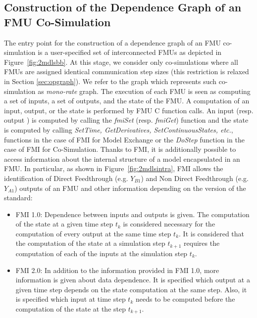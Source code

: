 \subsection{Construction of the Dependence Graph of an FMU Co-Simulation}

The entry point for the construction of a dependence graph of an FMU co-simulation is a user-specified set of interconnected FMUs as depicted in Figure~\ref{fig:2mdlsbb}. At this stage, we consider only co-simulations where all FMUs are assigned identical communication step sizes (this restriction is relaxed in Section \ref{sec:opgraph}). We refer to the graph which represents such co-simulation as \textit{mono-rate} graph. The execution of each FMU is seen as computing a set of inputs, a set of outputs, and the state of the FMU. A computation of an input, output, or the state is performed by FMU C function calls. An input (resp. output ) is computed by calling the \textit{fmiSet} (resp. \textit{fmiGet}) function and the state is computed by calling \textit{SetTime, GetDerivatives, SetContinuousStates, etc.}, functions in the case of FMI for Model Exchange or the \textit{DoStep} function in the case of FMI for Co-Simulation. Thanks to FMI, it is additionally possible to access information about the internal structure of a model encapsulated in an FMU. In particular, as shown in Figure~\ref{fig:2mdlsintra}, FMI allows the identification of Direct Feedthrough (e.g. $Y_{B1}$) and Non Direct Feedthrough (e.g. $Y_{A1}$) outputs of an FMU and other information depending on the version of the standard:

\begin{itemize}
\item FMI 1.0: Dependence between inputs and outputs is given. The computation of the state at a given time step $t_k$ is considered necessary for the computation of every output at the same time step $t_k$. It is considered that the computation of the state at a simulation step $t_{k+1}$ requires the computation of each of the inputs at the simulation step $t_{k}$.
\item FMI 2.0: In addition to the information provided in FMI 1.0, more information is given about data dependence. It is specified which output at a given time step depends on the state computation at the same step. Also, it is specified which input at time step $t_k$ needs to be computed before the computation of the state at the step $t_{k+1}$.  
\end{itemize}

